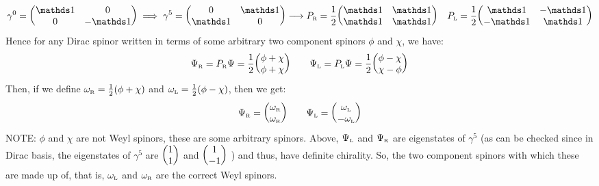 $$\gamma^0 = \mqty(\iden & 0 \\ 0& -\iden ) \implies \gamma^5 = \mqty( 0 & \iden \\ \iden & 0)\longrightarrow P_{\text{\tiny R}} =\frac{1}{2} \mqty(\iden&\iden\\ \iden& \iden) \quad   P_{\text{\tiny L}} = \frac{1}{2}\mqty(\iden& -\iden\\ -\iden& \iden)$$
Hence for any Dirac spinor written in terms of some arbitrary two component spinors $\phi$ and  $\chi$, we have:
$$\Psi_{\text{\tiny R}} = P_{\text{\tiny R}}\Psi = \frac{1}{2}\mqty(\phi+\chi\\ \phi+\chi)\qquad \Psi_{\text{\tiny L}} =P_{\text{\tiny L}}\Psi = \frac{1}{2}\mqty(\phi-\chi\\\chi-\phi)$$
Then, if we define $\omega_{\text{\tiny R}} =\frac{1}{2}( \phi+\chi)$ and $\omega_{\text{\tiny L}} = \frac{1}{2}(\phi-\chi)$, then we get:
\begin{equation}\label{eqn:omegachiral}
    \Psi_{\text{\tiny R}} = \mqty(\omega_{\text{\tiny R}}\\ \omega_{\text{\tiny R}})\qquad \Psi_{\text{\tiny L}} =\mqty(\omega_{\text{\tiny L}}\\-\omega_{\text{\tiny L}})
\end{equation}
NOTE: $\phi$ and $\chi$ are not Weyl spinors, these are some arbitrary spinors. Above, $\Psi_{\text{\tiny L}}$ and $\Psi_{\text{\tiny R}}$ are eigenstates of $\gamma^5$ (as can be checked since in Dirac basis, the eigenstates of $\gamma^5$ are $\mqty(1\\ 1)$ and $\mqty(1\\ -1)$ ) and thus, have definite chirality. So, the two component spinors with which these are made up of, that is, $\omega_{\text{\tiny L}}$ and $\omega_{\text{\tiny R}}$ are the correct Weyl spinors. 
